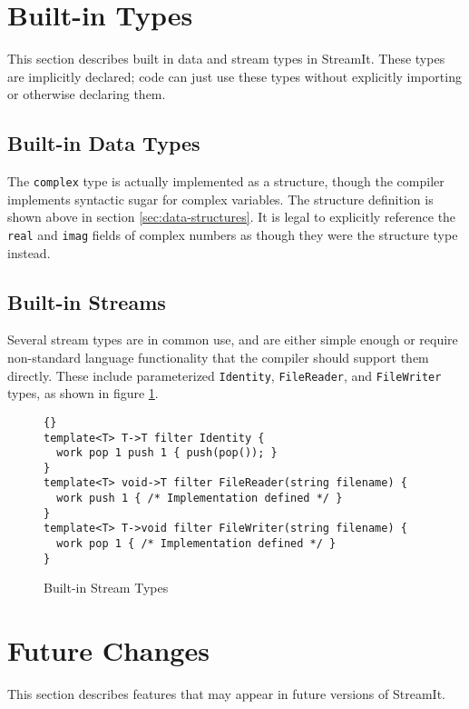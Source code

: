 \documentclass[11pt]{article}
\begin{document}
\section{Built-in Types}

This section describes built in data and stream types in StreamIt.
These types are implicitly declared; code can just use these types
without explicitly importing or otherwise declaring them.

\subsection{Built-in Data Types}

The \lstinline|complex| type is actually implemented as a structure,
though the compiler implements syntactic sugar for complex variables.
The structure definition is shown above in section
\ref{sec:data-structures}.
It is legal to explicitly reference the \lstinline|real| and
\lstinline|imag| fields of complex numbers as though they were the
structure type instead.

\subsection{Built-in Streams}

Several stream types are in common use, and are either simple enough
or require non-standard language functionality that the compiler
should support them directly.  These include parameterized
\lstinline|Identity|, \lstinline|FileReader|, and \lstinline|FileWriter| types, as
shown in figure \ref{fig:built-in-streams}.

\begin{figure}[htbp]
    \begin{lstlisting}{}
template<T> T->T filter Identity {
  work pop 1 push 1 { push(pop()); }
}
template<T> void->T filter FileReader(string filename) {
  work push 1 { /* Implementation defined */ }
}
template<T> T->void filter FileWriter(string filename) {
  work pop 1 { /* Implementation defined */ }
}
\end{lstlisting}
    \caption{Built-in Stream Types}
    \label{fig:built-in-streams}
\end{figure}

\section{Future Changes}

This section describes features that may appear in future versions of
StreamIt.
\end{document}
